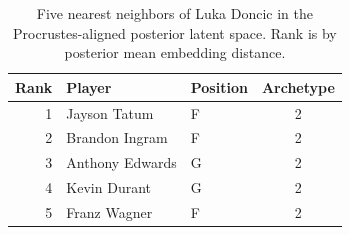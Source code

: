 \begin{table}[htbp]
  \centering\small
  \begin{tabular}{rllc}
    \toprule
    Rank & Player & Position & Archetype \\
    \midrule
    1 & Jayson Tatum & F & 2 \\
    2 & Brandon Ingram & F & 2 \\
    3 & Anthony Edwards & G & 2 \\
    4 & Kevin Durant & G & 2 \\
    5 & Franz Wagner & F & 2 \\
    \bottomrule
  \end{tabular}
  \caption{Five nearest neighbors of Luka Doncic in the Procrustes-aligned posterior latent space. Rank is by posterior mean embedding distance.}
  \label{tab:Luka_Doncic_neighbors}
\end{table}

